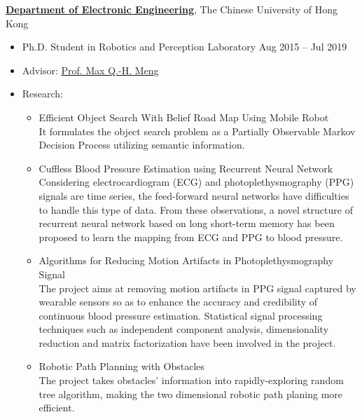 {\bf \href{https://www.ee.cuhk.edu.hk/}{Department of Electronic Engineering}}, The Chinese University of Hong Kong
\begin{itemize}
    \item[] Ph.D. Student in Robotics and Perception Laboratory \hfill Aug 2015 -- Jul 2019
    \item[] Advisor: \href{http://www.ee.cuhk.edu.hk/~qhmeng/about.html}{Prof. Max Q.-H. Meng}
    \item[] Research:
    \begin{itemize}
        \item Efficient Object Search With Belief Road Map Using Mobile Robot~\cite{wang2018efficient} \\
        It formulates the object search problem as a Partially Observable Markov Decision Process utilizing semantic information.
        \item Cuffless Blood Pressure Estimation using Recurrent Neural Network~\cite{lo2017continuous} \\
        Considering electrocardiogram (ECG) and photoplethysmography (PPG) signals are time series, the feed-forward neural networks have difficulties to handle this type of data.
        From these observations, a novel structure of recurrent neural network based on long short-term memory has been proposed to learn the mapping from ECG and PPG to blood pressure.
        \item Algorithms for Reducing Motion Artifacts in Photoplethysmography Signal~\cite{lo2017motion} \\
        The project aims at removing motion artifacts in PPG signal captured by wearable sensors so as to enhance the accuracy and credibility of continuous blood pressure estimation.
        Statistical signal processing techniques such as independent component analysis, dimensionality reduction and matrix factorization have been involved in the project.
        \item Robotic Path Planning with Obstacles~\cite{wang2016improved} \\
        The project takes obstacles' information into rapidly-exploring random tree algorithm, making the two dimensional robotic path planing more efficient.
    \end{itemize}
\end{itemize}
